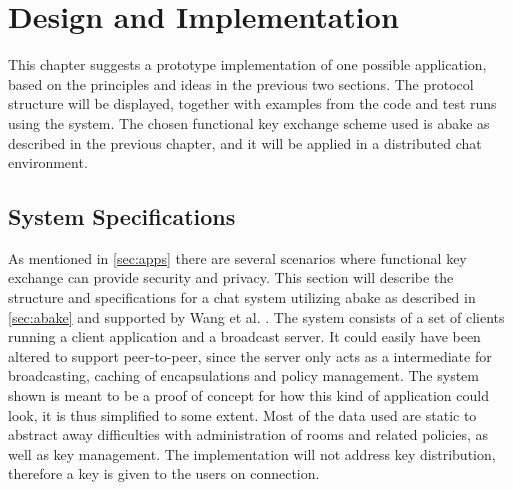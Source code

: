 \chapter{Design and Implementation}\label{chp:designimpl}
This chapter suggests a prototype implementation of one possible application, based on the principles and ideas in the previous two sections. The protocol structure will be displayed, together with examples from the code and test runs using the system. The chosen functional key exchange scheme used is \gls{abake} as described in the previous chapter, and it will be applied in a distributed chat environment. 

\section{System Specifications}\label{sec:chat}
As mentioned in \ref{sec:apps} there are several scenarios where functional key exchange can provide security and privacy. This section will describe the structure and specifications for a chat system utilizing \gls{abake} as described in \ref{sec:abake} and  supported by Wang et al. \cite{DBLP:abake}. The system consists of a set of clients running a client application and a broadcast server. It could easily have been altered to support peer-to-peer, since the server only acts as a intermediate for broadcasting, caching of encapsulations and policy management. The system shown is meant to be a proof of concept for how this kind of application could look, it is thus simplified to some extent. Most of the data used are static to abstract away difficulties with administration of rooms and related policies, as well as key management. The implementation will not address key distribution, therefore a key is given to the users on connection. 



